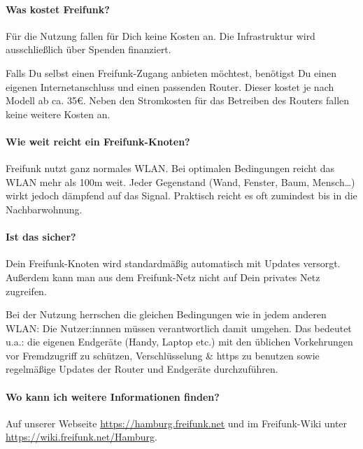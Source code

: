 \documentclass[10pt,a4paper,notumble]{leaflet}
\begin{document}
\paragraph{Was kostet Freifunk?}
Für die Nutzung fallen für Dich keine Kosten an. Die Infrastruktur wird ausschließlich über Spenden finanziert.

Falls Du selbst einen Freifunk-Zugang anbieten möchtest, benötigst Du einen eigenen Internetanschluss und einen passenden Router. Dieser kostet je nach Modell ab ca. 35€.  Neben den Stromkosten für das Betreiben des Routers fallen keine weitere Kosten an.

\paragraph{Wie weit reicht ein Freifunk-Knoten?} Freifunk nutzt ganz normales WLAN. Bei optimalen Bedingungen reicht das WLAN mehr als 100m weit. Jeder Gegenstand (Wand, Fenster, Baum, Mensch…) wirkt jedoch dämpfend auf das Signal. Praktisch reicht es oft zumindest bis in die Nachbarwohnung.

\paragraph{Ist das sicher?} Dein Freifunk-Knoten wird standardmäßig automatisch mit Updates versorgt. Außerdem kann man aus dem Freifunk-Netz nicht auf Dein privates Netz zugreifen.

Bei der Nutzung herrschen die gleichen Bedingungen wie in jedem anderen WLAN: Die Nutzer:innnen müssen verantwortlich damit umgehen. Das bedeutet u.a.: die eigenen Endgeräte (Handy, Laptop etc.) mit den üblichen Vorkehrungen vor Fremdzugriff zu schützen, Verschlüsselung \& https zu benutzen sowie regelmäßige Updates der Router und Endgeräte durchzuführen.

\paragraph{Wo kann ich weitere Informationen finden?} Auf unserer Webseite \href{https://hamburg.freifunk.net}{https://hamburg.freifunk.net} und im Freifunk-Wiki unter \href{https://wiki.freifunk.net/Hamburg}{https://wiki.freifunk.net/Hamburg}.
\end{document}
